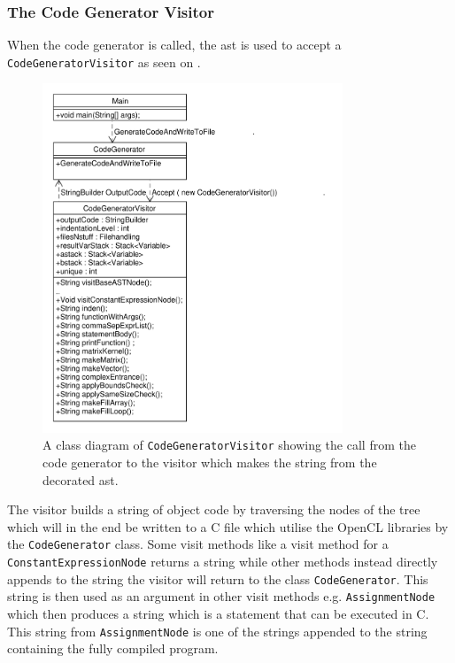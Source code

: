\subsubsection*{The Code Generator Visitor}
When the code generator is called, the \acrshort{ast} is used to accept a \texttt{CodeGeneratorVisitor} as seen on .

\begin{figure}[!ht]
\centering
 \includegraphics[width=0.8\textwidth]{figures/ClassDiagrams/CodeGeneratorCall.pdf}%
\caption{A class diagram of \texttt{CodeGeneratorVisitor} showing the call from the code generator to the visitor which makes the string from the decorated \acrshort{ast}.}\label{fig:CodeGeneratorVisitor}
\vspace{-15pt}
\end{figure}

The visitor builds a string of object code by traversing the nodes of the tree which will in the end be written to a  C file which utilise the OpenCL libraries by the \texttt{CodeGenerator} class.
Some visit methods like a visit method for a \texttt{ConstantExpressionNode} returns a string while other methods instead directly appends to the string the visitor will return to the class \texttt{CodeGenerator}.
This string is then used as an argument in other visit methods e.g. \texttt{AssignmentNode} which then produces a string which is a statement that can be executed in C.
This string from \texttt{AssignmentNode} is one of the strings appended to the string containing the fully compiled program.

